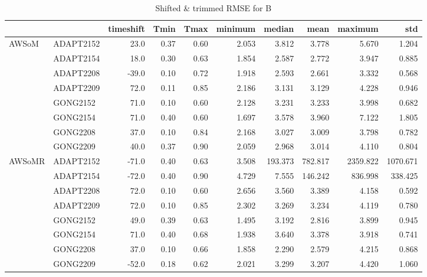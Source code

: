 \begin{table}
\centering
\caption{Shifted \& trimmed RMSE for B}
\begin{tabular}{llrrrrrrrr}
\toprule
       &          &  timeshift &  Tmin &  Tmax &  minimum &   median &     mean &   maximum &       std \\
\midrule
\multirow{8}{*}{AWSoM} & ADAPT2152 &       23.0 &  0.37 &  0.60 &    2.053 &    3.812 &    3.778 &     5.670 &     1.204 \\
       & ADAPT2154 &       18.0 &  0.30 &  0.63 &    1.854 &    2.587 &    2.772 &     3.947 &     0.885 \\
       & ADAPT2208 &      -39.0 &  0.10 &  0.72 &    1.918 &    2.593 &    2.661 &     3.332 &     0.568 \\
       & ADAPT2209 &       72.0 &  0.11 &  0.85 &    2.186 &    3.131 &    3.129 &     4.228 &     0.946 \\
       & GONG2152 &       71.0 &  0.10 &  0.60 &    2.128 &    3.231 &    3.233 &     3.998 &     0.682 \\
       & GONG2154 &       71.0 &  0.40 &  0.60 &    1.697 &    3.578 &    3.960 &     7.122 &     1.805 \\
       & GONG2208 &       37.0 &  0.10 &  0.84 &    2.168 &    3.027 &    3.009 &     3.798 &     0.782 \\
       & GONG2209 &       40.0 &  0.37 &  0.90 &    2.059 &    2.968 &    3.014 &     4.110 &     0.804 \\
\cline{1-10}
\multirow{8}{*}{AWSoMR} & ADAPT2152 &      -71.0 &  0.40 &  0.63 &    3.508 &  193.373 &  782.817 &  2359.822 &  1070.671 \\
       & ADAPT2154 &      -72.0 &  0.40 &  0.90 &    4.729 &    7.555 &  146.242 &   836.998 &   338.425 \\
       & ADAPT2208 &       72.0 &  0.10 &  0.60 &    2.656 &    3.560 &    3.389 &     4.158 &     0.592 \\
       & ADAPT2209 &       72.0 &  0.10 &  0.85 &    2.302 &    3.269 &    3.234 &     4.119 &     0.780 \\
       & GONG2152 &       49.0 &  0.39 &  0.63 &    1.495 &    3.192 &    2.816 &     3.899 &     0.945 \\
       & GONG2154 &       71.0 &  0.40 &  0.68 &    1.938 &    3.640 &    3.378 &     3.918 &     0.741 \\
       & GONG2208 &       37.0 &  0.10 &  0.66 &    1.858 &    2.290 &    2.579 &     4.215 &     0.868 \\
       & GONG2209 &      -52.0 &  0.18 &  0.62 &    2.021 &    3.299 &    3.207 &     4.420 &     1.060 \\
\bottomrule
\end{tabular}
\end{table}
